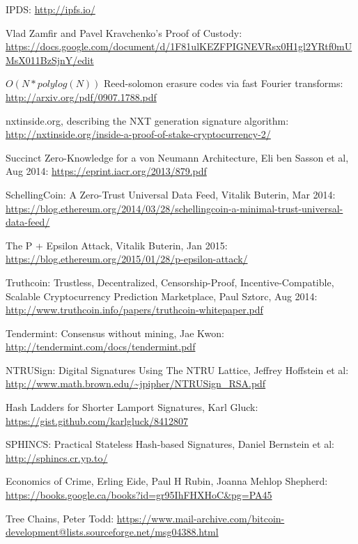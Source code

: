 \documentclass[11pt,a4paper]{report}
\theoremstyle{plain}
\theoremstyle{definition}
\theoremstyle{remark}
\begin{document}
\begin{thebibliography}{27}
    IPDS: \url{http://ipfs.io/}

    Vlad Zamfir and Pavel Kravchenko's Proof of Custody: \url{https://docs.google.com/document/d/1F81ulKEZFPIGNEVRsx0H1gl2YRtf0mUMsX011BzSjnY/edit}

    $O(N*polylog(N))$ Reed-solomon erasure codes via fast Fourier transforms: \url{http://arxiv.org/pdf/0907.1788.pdf}

    nxtinside.org, describing the NXT generation signature algorithm: \url{http://nxtinside.org/inside-a-proof-of-stake-cryptocurrency-2/}

    Succinct Zero-Knowledge for a von Neumann Architecture, Eli ben Sasson et al, Aug 2014: \url{https://eprint.iacr.org/2013/879.pdf}

    SchellingCoin: A Zero-Trust Universal Data Feed, Vitalik Buterin, Mar 2014: \url{https://blog.ethereum.org/2014/03/28/schellingcoin-a-minimal-trust-universal-data-feed/}

    The P + Epsilon Attack, Vitalik Buterin, Jan 2015: \url{https://blog.ethereum.org/2015/01/28/p-epsilon-attack/}

    Truthcoin: Trustless, Decentralized, Censorship-Proof, Incentive-Compatible, Scalable Cryptocurrency Prediction Marketplace, Paul Sztorc, Aug 2014: \url{http://www.truthcoin.info/papers/truthcoin-whitepaper.pdf}

    Tendermint: Consensus without mining, Jae Kwon: \url{http://tendermint.com/docs/tendermint.pdf}

    NTRUSign: Digital Signatures Using The NTRU Lattice, Jeffrey Hoffstein et al: \url{http://www.math.brown.edu/~jpipher/NTRUSign_RSA.pdf}

    Hash Ladders for Shorter Lamport Signatures, Karl Gluck: \url{https://gist.github.com/karlgluck/8412807}

    SPHINCS: Practical Stateless Hash-based Signatures, Daniel Bernstein et al: \url{http://sphincs.cr.yp.to/}

    Economics of Crime, Erling Eide, Paul H Rubin, Joanna Mehlop Shepherd: \url{https://books.google.ca/books?id=gr95IhFHXHoC&pg=PA45}

    Tree Chains, Peter Todd: \url{https://www.mail-archive.com/bitcoin-development@lists.sourceforge.net/msg04388.html}


\end{thebibliography}
\end{document}
